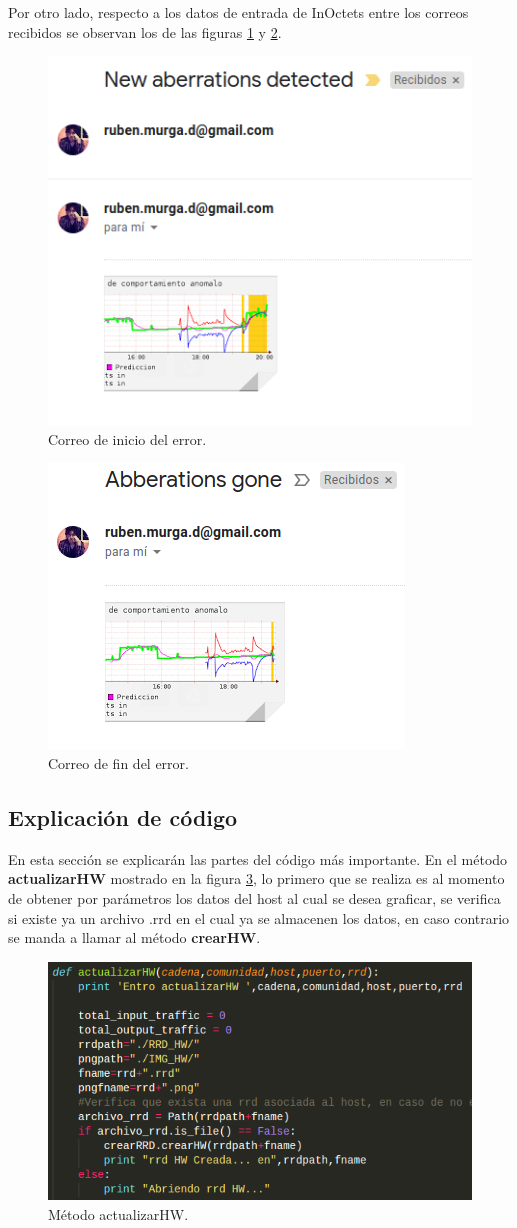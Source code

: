 \FloatBarrier
Por otro lado, respecto a los datos de entrada de InOctets entre los correos recibidos se observan los de las figuras \ref{image:inicio1} y \ref{image:fin1}.
\FloatBarrier
\begin{figure}[htbp!]
		\centering
			\includegraphics[width=.5 \textwidth]{images/inicio1}
		\caption{Correo de inicio del error.}
		\label{image:inicio1}
\end{figure}
\FloatBarrier
\FloatBarrier
\begin{figure}[htbp!]
		\centering
			\includegraphics[width=.45 \textwidth]{images/fin1}
		\caption{Correo de fin del error.}
		\label{image:fin1}
\end{figure}
\FloatBarrier

\subsection{Explicación de código}
En esta sección se explicarán las partes del código más importante. En el método \textbf{actualizarHW} mostrado en la figura \ref{image:codigo4}, lo primero que se realiza es al momento de obtener por parámetros los datos del host al cual se desea graficar, se verifica si existe ya un archivo .rrd en el cual ya se almacenen los datos, en caso contrario se manda a llamar al método \textbf{crearHW}.
\FloatBarrier
\begin{figure}[htbp!]
		\centering
			\includegraphics[width=.7 \textwidth]{images/codigo4}
		\caption{Método actualizarHW.}
		\label{image:codigo4}
\end{figure}
\FloatBarrier


